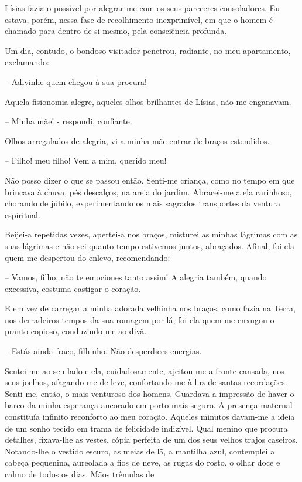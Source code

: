 \documentclass[portuguese,12pt,a4paper]{scrbook}
\begin{document}
	Lísias fazia o possível por alegrar-me com os seus pareceres consoladores. Eu estava, porém, nessa fase de recolhimento inexprimível, em que o homem é chamado para dentro de si mesmo, pela consciência profunda.
	
	Um dia, contudo, o bondoso visitador penetrou, radiante, no meu apartamento, exclamando:
	
	– Adivinhe quem chegou à sua procura!
	
	Aquela fisionomia alegre, aqueles olhos brilhantes de Lísias, não me enganavam.
	
	
	– Minha mãe! - respondi, confiante.
	
	Olhos arregalados de alegria, vi a minha mãe entrar de braços estendidos.
	
	– Filho! meu filho! Vem a mim, querido meu!
	
	Não posso dizer o que se passou então. Senti-me criança, como no tempo em que brincava à chuva, pés descalços, na areia do jardim. Abracei-me a ela carinhoso, chorando de júbilo, experimentando os mais sagrados transportes da ventura espiritual.
	
	Beijei-a repetidas vezes, apertei-a nos braços, misturei as minhas lágrimas com as suas lágrimas e não sei quanto tempo estivemos juntos, abraçados. Afinal, foi ela quem me despertou do enlevo, recomendando:
	
	– Vamos, filho, não te emociones tanto assim! A alegria também, quando excessiva, costuma castigar o coração.
	
	E em vez de carregar a minha adorada velhinha nos braços, como fazia na Terra, nos derradeiros tempos da sua romagem por lá, foi ela quem me enxugou o pranto copioso, conduzindo-me ao divã.
	
	– Estás ainda fraco, filhinho. Não desperdices energias.
	
	Sentei-me ao seu lado e ela, cuidadosamente, ajeitou-me a fronte cansada, nos seus joelhos, afagando-me de leve, confortando-me à luz de santas recordações. Senti-me, então, o mais venturoso dos homens. Guardava a impressão de haver o barco da minha esperança ancorado em porto mais seguro. A presença maternal constituía infinito reconforto ao meu coração. Aqueles minutos davam-me a ideia de um sonho tecido em trama de felicidade indizível. Qual menino que procura detalhes, fixava-lhe as vestes, cópia perfeita de um dos seus velhos trajos caseiros. Notando-lhe o vestido escuro, as meias de lã, a mantilha azul, contemplei a cabeça pequenina, aureolada a fios de neve, as rugas do rosto, o olhar doce e calmo de todos os dias. Mãos trêmulas de
	
\end{document}
